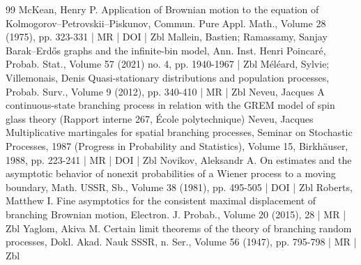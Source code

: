 \documentclass[10pt]{amsart}
\theoremstyle{definition}\newtheorem{defi}[theo]{Definition}\newtheorem{rema}[theo]{Remark}\newtheorem{exam}[theo]{Example}\newtheorem{exem}[theo]{Example}\newtheorem{nota}[theo]{Notation}
\newcommand{\1} {\mathds{1}}
\begin{document}
\begin{thebibliography}{99}
McKean, Henry P. Application of Brownian motion to the equation of Kolmogorov–Petrovskii–Piskunov, Commun. Pure Appl. Math., Volume 28 (1975), pp. 323-331 | MR | DOI | Zbl
Mallein, Bastien; Ramassamy, Sanjay Barak–Erdős graphs and the infinite-bin model, Ann. Inst. Henri Poincaré, Probab. Stat., Volume 57 (2021) no. 4, pp. 1940-1967 | Zbl
Méléard, Sylvie; Villemonais, Denis Quasi-stationary distributions and population processes, Probab. Surv., Volume 9 (2012), pp. 340-410 | MR | Zbl
Neveu, Jacques A continuous-state branching process in relation with the GREM model of spin glass theory (Rapport interne 267, École polytechnique)
Neveu, Jacques Multiplicative martingales for spatial branching processes, Seminar on Stochastic Processes, 1987 (Progress in Probability and Statistics), Volume 15, Birkhäuser, 1988, pp. 223-241 | MR | DOI | Zbl
Novikov, Aleksandr A. On estimates and the asymptotic behavior of nonexit probabilities of a Wiener process to a moving boundary, Math. USSR, Sb., Volume 38 (1981), pp. 495-505 | DOI | Zbl
Roberts, Matthew I. Fine asymptotics for the consistent maximal displacement of branching Brownian motion, Electron. J. Probab., Volume 20 (2015), 28 | MR | Zbl
Yaglom, Akiva M. Certain limit theorems of the theory of branching random processes, Dokl. Akad. Nauk SSSR, n. Ser., Volume 56 (1947), pp. 795-798 | MR | Zbl
\end{thebibliography}
\end{document}
